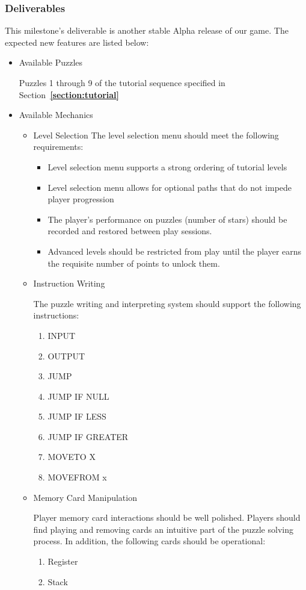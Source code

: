 \subsubsection*{Deliverables}
This milestone’s deliverable is another stable Alpha release of our game. The expected new features are listed below:

\begin{itemize}

  \item Available Puzzles
  
  Puzzles 1 through 9 of the tutorial sequence specified in Section~\textbf{\ref{section:tutorial}}

  \item Available Mechanics
  \begin{itemize}
    \item Level Selection
    The level selection menu should meet the following requirements:
    \begin{itemize}
      \item Level selection menu supports a strong ordering of tutorial levels
      \item Level selection menu allows for optional paths that do not impede player progression
      \item The player's performance on puzzles (number of stars) should be recorded and restored between play sessions.
      \item Advanced levels should be restricted from play until the player earns the requisite number of points to unlock them.
    \end{itemize}

    \item Instruction Writing
    
    The puzzle writing and interpreting system should support the following instructions:

    \begin{enumerate}
      \item INPUT
      \item OUTPUT
      \item JUMP
      \item JUMP IF NULL
      \item JUMP IF LESS
      \item JUMP IF GREATER
      \item MOVETO X
      \item MOVEFROM x
    \end{enumerate}

    \item Memory Card Manipulation
    
    Player memory card interactions should be well polished. Players should find playing and removing cards an intuitive part of the puzzle solving process. In addition, the following cards should be operational:

    \begin{enumerate}
      \item Register
      \item Stack
    \end{enumerate}
  \end{itemize}
\end{itemize}

